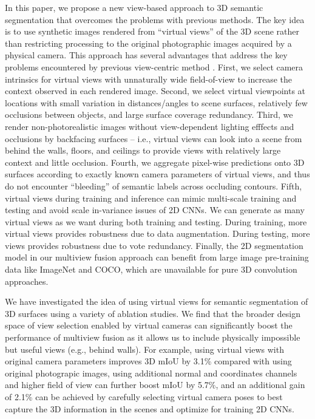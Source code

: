 \documentclass[runningheads]{llncs}
\begin{document}
In this paper, we propose a new view-based approach to 3D semantic segmentation that overcomes the problems with previous methods. The key idea is to use synthetic images rendered from ``virtual views'' of the 3D scene rather than restricting processing to the original photographic images acquired by a physical camera.   This approach has several advantages that address the key problems encountered by previous view-centric method \cite{boulch2018snapnet,lawin2017deep}.  First, we select camera intrinsics for virtual views with unnaturally wide field-of-view to increase the context observed in each rendered image.   Second, we select virtual viewpoints at locations with small variation in distances/angles to scene surfaces, relatively few occlusions between objects, and large surface coverage redundancy.  Third, we render non-photorealistic images without view-dependent lighting efffects and occlusions by backfacing surfaces -- i.e., virtual views can look into a scene from behind the walls, floors, and ceilings to provide views with relatively large context and little occlusion.  Fourth, we aggregate pixel-wise predictions onto 3D surfaces according to exactly known camera parameters of virtual views, and thus do not encounter ``bleeding'' of semantic labels across occluding contours. Fifth, virtual views during training and inference can mimic multi-scale training and testing and avoid scale in-variance issues of 2D CNNs. We can generate as many virtual views as we want during both training and testing. During training, more virtual views provides robustness due to data augmentation.  During testing, more views provides robustness due to vote redundancy. Finally, the 2D segmentation model in our multiview fusion approach can benefit from large image pre-training data like ImageNet and COCO, which are unavailable for pure 3D convolution approaches.

We have investigated the idea of using virtual views for semantic segmentation of 3D surfaces using a variety of ablation studies. We find that the broader design space of view selection enabled by virtual cameras can significantly boost the performance of multiview fusion as it allows us to include physically impossible but useful views (e.g., behind walls). For example, using virtual views with original camera parameters improves 3D mIoU by 3.1\% compared with using original photograpic images, using additional normal and coordinates channels and higher field of view can further boost mIoU by 5.7\%, and an additional gain of 2.1\% can be achieved by carefully selecting virtual camera poses to best capture the 3D information in the scenes and optimize for training 2D CNNs.
\end{document}

